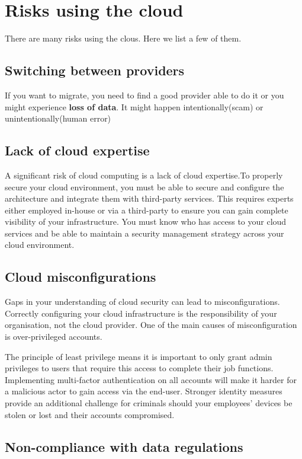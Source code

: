 \documentclass[a4paper,12pt]{book}
\begin{document}
\clearpage
\section{Risks using the cloud}

There are many risks using the clous. Here we list a few of them.

\subsection{Switching between providers} \flushleft
If you want to migrate, you need to find a good provider able to do it or you might experience \textbf{loss of data}. It might happen intentionally(scam) or unintentionally(human error)


\subsection{Lack of cloud expertise}

A significant risk of cloud computing is a lack of cloud expertise.To properly secure your cloud environment, you must be able to  secure and configure the architecture and integrate them with third-party services. This requires experts either employed in-house or via a third-party to ensure you can gain complete visibility of your infrastructure. You must know who has access to your cloud services and be able to maintain a security management strategy across your cloud environment.


\subsection{Cloud misconfigurations}

Gaps in your understanding of cloud security can lead to misconfigurations. Correctly configuring your cloud infrastructure is the responsibility of your organisation, not the cloud provider. One of the main causes of misconfiguration is over-privileged accounts. 

The principle of least privilege means it is important to only grant admin privileges to users that require this access to complete their job functions. Implementing multi-factor authentication on all accounts will make it harder for a malicious actor to gain access via the end-user. Stronger identity measures provide an additional challenge for criminals should your employees’ devices be stolen or lost and their accounts compromised.


\subsection{Non-compliance with data regulations}
\end{document}
